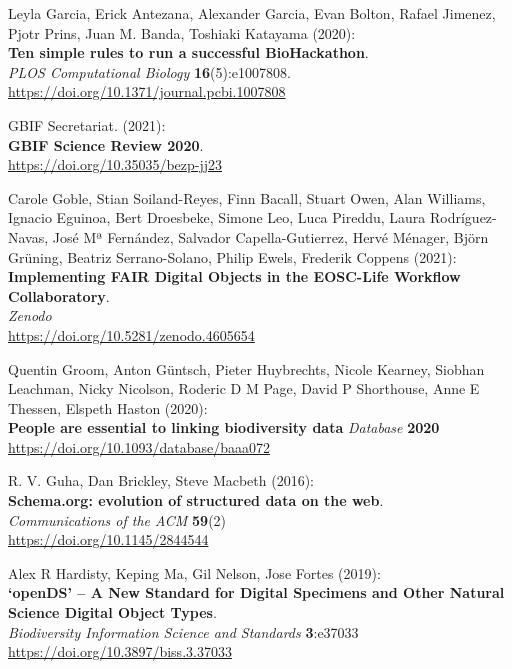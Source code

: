\begin{thebibliography}{9}
Leyla Garcia, Erick Antezana, Alexander Garcia, Evan Bolton,
Rafael Jimenez, Pjotr Prins, Juan M. Banda, Toshiaki Katayama (2020):\\
\textbf{Ten simple rules to run a successful BioHackathon}. \\
\emph{PLOS Computational Biology} \textbf{16}(5):e1007808.\\
\url{https://doi.org/10.1371/journal.pcbi.1007808}

GBIF Secretariat. (2021):\\
\textbf{GBIF Science Review 2020}.\\
\url{https://doi.org/10.35035/bezp-jj23}

Carole Goble, Stian Soiland-Reyes, Finn Bacall, Stuart
Owen, Alan Williams, Ignacio Eguinoa, Bert Droesbeke, Simone Leo, Luca
Pireddu, Laura Rodríguez-Navas, José Mª Fernández, Salvador
Capella-Gutierrez, Hervé Ménager, Björn Grüning, Beatriz Serrano-Solano,
Philip Ewels, Frederik Coppens (2021):\\
\textbf{Implementing FAIR Digital Objects in the EOSC-Life Workflow
Collaboratory}.\\
\emph{Zenodo}\\
\url{https://doi.org/10.5281/zenodo.4605654}

Quentin Groom, Anton Güntsch, Pieter Huybrechts, Nicole Kearney, Siobhan Leachman, Nicky Nicolson, Roderic D M Page, David P Shorthouse, Anne E Thessen, Elspeth Haston (2020):\\
\textbf{People are essential to linking biodiversity data}
\emph{Database} \textbf{2020}\\
\url{https://doi.org/10.1093/database/baaa072}

R. V. Guha, Dan Brickley, Steve Macbeth (2016):\\
\textbf{Schema.org: evolution of structured data on the web}.\\
\emph{Communications of the ACM} \textbf{59}(2)\\
\url{https://doi.org/10.1145/2844544}

Alex R Hardisty, Keping Ma, Gil Nelson, Jose Fortes
(2019):\\
\textbf{`openDS' -- A New Standard for Digital Specimens and Other
Natural Science Digital Object Types}.\\
\emph{Biodiversity Information Science and Standards}
\textbf{3}:e37033\\
\url{https://doi.org/10.3897/biss.3.37033}


\end{thebibliography}
